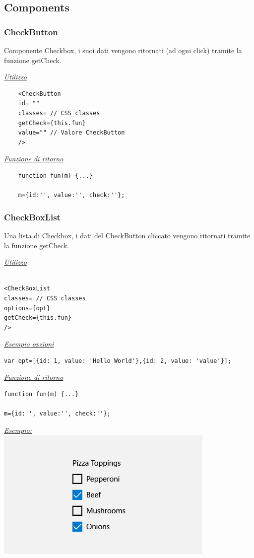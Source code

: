 \subsection{Components}

\subsubsection{CheckButton}

Componente Checkbox, i suoi dati vengono ritornati (ad ogni click) tramite la funzione getCheck.
\begin{center}
	\underline{\textit{Utilizzo}}
	\begin{lstlisting}
	<CheckButton
	id= ""
	classes= // CSS classes
	getCheck={this.fun}
	value="" // Valore CheckButton
	/>
	\end{lstlisting}
	\underline{\textit{Funzione di ritorno}}
	\begin{lstlisting}
	function fun(m) {...}
	
	m={id:'', value:'', check:''};
	\end{lstlisting}
\end{center}

\subsubsection{CheckBoxList}
Una lista di Checkbox, i dati del CheckButton cliccato vengono ritornati tramite la funzione getCheck.
\begin{center}
\underline{\textit{Utilizzo}}
\begin{lstlisting}

<CheckBoxList
classes= // CSS classes
options={opt}
getCheck={this.fun}
/>
\end{lstlisting}
\underline{\textit{Esempio opzioni}}
\begin{lstlisting}
var opt=[{id: 1, value: 'Hello World'},{id: 2, value: 'value'}];
\end{lstlisting}
\underline{\textit{Funzione di ritorno}}
\begin{lstlisting}
function fun(m) {...}

m={id:'', value:'', check:''};
\end{lstlisting}
\underline{\textit{Esempio:}}
\\
\includegraphics[scale=0.53]{img/checkbox.png}
\\
\end{center}


